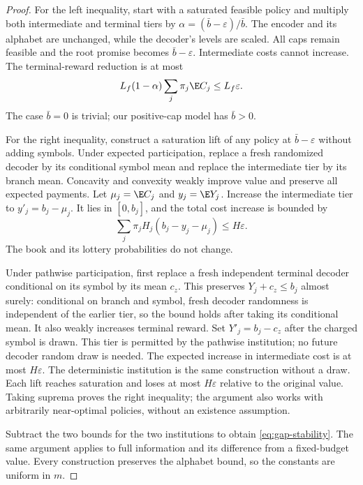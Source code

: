 \begin{proof}
For the left inequality, start with a saturated feasible policy and multiply both intermediate and terminal tiers by $\alpha=(\bar b-\varepsilon)/\bar b$. The encoder and its alphabet are unchanged, while the decoder's levels are scaled. All caps remain feasible and the root promise becomes $\bar b-\varepsilon$. Intermediate costs cannot increase. The terminal-reward reduction is at most
\[
 L_f(1-\alpha)\sum_j\pi_j\E C_j\leq L_f\varepsilon.
\]
The case $\bar b=0$ is trivial; our positive-cap model has $\bar b>0$.

For the right inequality, construct a saturation lift of any policy at $\bar b-\varepsilon$ without adding symbols. Under expected participation, replace a fresh randomized decoder by its conditional symbol mean and replace the intermediate tier by its branch mean. Concavity and convexity weakly improve value and preserve all expected payments. Let $\mu_j=\E C_j$ and $y_j=\E Y_j$. Increase the intermediate tier to $y'_j=b_j-\mu_j$. It lies in $[0,b_j]$, and the total cost increase is bounded by
\[
 \sum_j\pi_j H_j(b_j-y_j-\mu_j)\leq H\varepsilon.
\]
The book and its lottery probabilities do not change.

Under pathwise participation, first replace a fresh independent terminal decoder conditional on its symbol by its mean $c_z$. This preserves $Y_j+c_z\leq b_j$ almost surely: conditional on branch and symbol, fresh decoder randomness is independent of the earlier tier, so the bound holds after taking its conditional mean. It also weakly increases terminal reward. Set $Y'_j=b_j-c_z$ after the charged symbol is drawn. This tier is permitted by the pathwise institution; no future decoder random draw is needed. The expected increase in intermediate cost is at most $H\varepsilon$. The deterministic institution is the same construction without a draw. Each lift reaches saturation and loses at most $H\varepsilon$ relative to the original value. Taking suprema proves the right inequality; the argument also works with arbitrarily near-optimal policies, without an existence assumption.

Subtract the two bounds for the two institutions to obtain \eqref{eq:gap-stability}. The same argument applies to full information and its difference from a fixed-budget value. Every construction preserves the alphabet bound, so the constants are uniform in $m$.
\end{proof}

